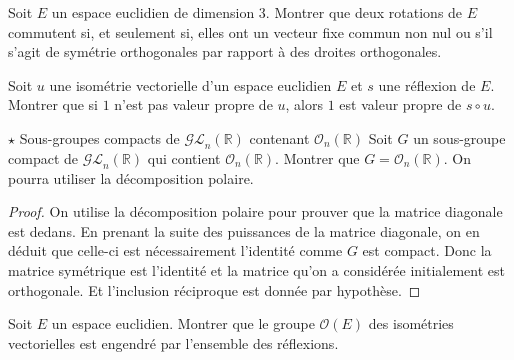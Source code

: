 \documentclass[french,a4paper]{article}
\newcommand{\R}{\mathbb{R}}
\theoremstyle{plain}
\theoremstyle{definition}
\theoremstyle{remark}
\begin{document}
\begin{ex}{}
	Soit $E$ un espace euclidien de dimension $3$. Montrer que deux rotations de $E$ commutent si, et seulement si, elles ont un vecteur fixe commun non nul ou s'il s'agit de symétrie orthogonales par rapport à des droites orthogonales.
\end{ex}

\begin{ex}{}
	Soit $u$ une isométrie vectorielle d'un espace euclidien $E$ et $s$ une réflexion de $E$. Montrer que si $1$ n'est pas valeur propre de $u$, alors $1$ est valeur propre de $s\circ u$.
\end{ex}

\begin{ex}{$\star$ Sous-groupes compacts de $\mathcal{GL}_n(\R)$ contenant $\mathcal{O}_n(\R)$}
	Soit $G$ un sous-groupe compact de $\mathcal{GL}_n(\R)$ qui contient $\mathcal{O}_n(\R)$. Montrer que $G=\mathcal{O}_n(\R)$. On pourra utiliser la décomposition polaire.
\end{ex}
\begin{proof}
	On utilise la décomposition polaire pour prouver que la matrice diagonale est dedans. En prenant la suite des puissances de la matrice diagonale, on en déduit que celle-ci est nécessairement l'identité comme $G$ est compact. Donc la matrice symétrique est l'identité et la matrice qu'on a considérée initialement est orthogonale. Et l'inclusion réciproque est donnée par hypothèse.
\end{proof}

\begin{ex}{}
	Soit $E$ un espace euclidien. Montrer que le groupe $\mathcal{O}(E)$ des isométries vectorielles est engendré par l'ensemble des réflexions.
\end{ex}
\end{document}
